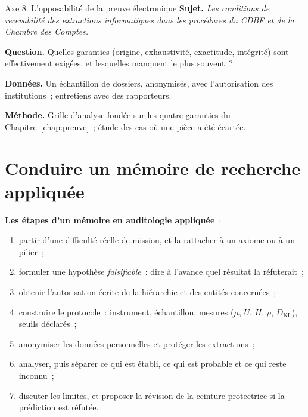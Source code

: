 \begin{boxscenario}{Axe 8. L'opposabilité de la preuve électronique}
\textbf{Sujet.} \emph{Les conditions de recevabilité des extractions
informatiques dans les procédures du CDBF et de la Chambre des Comptes.}

\textbf{Question.} Quelles garanties (origine, exhaustivité, exactitude,
intégrité) sont effectivement exigées, et lesquelles manquent le plus
souvent~?

\textbf{Données.} Un échantillon de dossiers, anonymisés, avec l'autorisation
des institutions~; entretiens avec des rapporteurs.

\textbf{Méthode.} Grille d'analyse fondée sur les quatre garanties du
Chapitre~\ref{chap:preuve}~; étude des cas où une pièce a été écartée.
\end{boxscenario}

\separateur

\section{Conduire un mémoire de recherche appliquée}
\label{sec:c15-memoire}

\begin{boxprocedure}
\textbf{Les étapes d'un mémoire en auditologie appliquée}~:
\begin{enumerate}
    \item partir d'une difficulté réelle de mission, et la rattacher à un
          axiome ou à un pilier~;
    \item formuler une hypothèse \emph{falsifiable}~: dire à l'avance quel
          résultat la réfuterait~;
    \item obtenir l'autorisation écrite de la hiérarchie et des entités
          concernées~;
    \item construire le protocole~: instrument, échantillon, mesures
          ($\mu$, $U$, $H$, $\rho$, $D_{\mathrm{KL}}$), seuils déclarés~;
    \item anonymiser les données personnelles et protéger les extractions~;
    \item analyser, puis séparer ce qui est établi, ce qui est probable et ce
          qui reste inconnu~;
    \item discuter les limites, et proposer la révision de la ceinture
          protectrice si la prédiction est réfutée.
\end{enumerate}
\end{boxprocedure}

